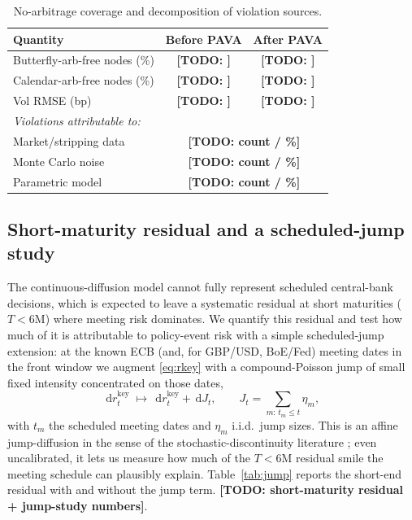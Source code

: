 \documentclass[11pt]{article}
\newcommand{\TODO}[1]{\textbf{[TODO: #1]}}
\newcommand{\key}{\mathrm{key}}
\newcommand{\dd}{\,\mathrm{d}}
\theoremstyle{plain}
\theoremstyle{definition}
\begin{document}
\begin{table}[t]
\centering
\caption{No-arbitrage coverage and decomposition of violation sources.}
\label{tab:arb}
\begin{tabular}{lcc}
\toprule
Quantity & Before PAVA & After PAVA \\
\midrule
Butterfly-arb-free nodes (\%)  & \TODO{} & \TODO{} \\
Calendar-arb-free nodes (\%)   & \TODO{} & \TODO{} \\
Vol RMSE (bp)                  & \TODO{} & \TODO{} \\
\midrule
\multicolumn{3}{l}{\emph{Violations attributable to:}} \\
\quad Market/stripping data    & \multicolumn{2}{c}{\TODO{count / \%}} \\
\quad Monte Carlo noise        & \multicolumn{2}{c}{\TODO{count / \%}} \\
\quad Parametric model         & \multicolumn{2}{c}{\TODO{count / \%}} \\
\bottomrule
\end{tabular}
\end{table}

\subsection{Short-maturity residual and a scheduled-jump study}
\label{sec:jump}

The continuous-diffusion model cannot fully represent scheduled central-bank
decisions, which is expected to leave a systematic residual at short maturities
($T < 6$M) where meeting risk dominates. We quantify this residual and test how
much of it is attributable to policy-event risk with a simple scheduled-jump
extension: at the known ECB (and, for GBP/USD, BoE/Fed) meeting dates in the
front window we augment \eqref{eq:rkey} with a compound-Poisson jump of small
fixed intensity concentrated on those dates,
\begin{equation}
\dd r^{\key}_t \;\longmapsto\; \dd r^{\key}_t + \dd J_t,
\qquad J_t = \sum_{m:\,t_m \le t} \eta_m,
\label{eq:jump}
\end{equation}
with $t_m$ the scheduled meeting dates and $\eta_m$ i.i.d.\ jump sizes. This is
an affine jump-diffusion in the sense of the stochastic-discontinuity literature
\citep{FGGS2020,FGS2023}; even uncalibrated, it lets us measure how much of the
$T<6$M residual smile the meeting schedule can plausibly explain.
Table~\ref{tab:jump} reports the short-end residual with and without the jump
term. \TODO{short-maturity residual + jump-study numbers}.
\end{document}
